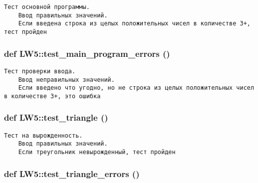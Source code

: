 \footnotesize\begin{verbatim}Тест основной программы.
    Ввод правильных значений.
    Если введена строка из целых положительных чисел в количестве 3+, тест пройден\end{verbatim}
\normalsize
 \hypertarget{namespace_l_w5_24b0846f3346125f53f802a4f6291546}{
\subsubsection[{test\_\-main\_\-program\_\-errors}]{\setlength{\rightskip}{0pt plus 5cm}def LW5::test\_\-main\_\-program\_\-errors ()}}
\label{namespace_l_w5_24b0846f3346125f53f802a4f6291546}




\footnotesize\begin{verbatim}Тест проверки ввода.
    Ввод неправильных значений.
    Если введено что угодно, но не строка из целых положительных чисел в количестве 3+, это ошибка\end{verbatim}
\normalsize
 \hypertarget{namespace_l_w5_a8dfc65142348966740631e021a65b50}{
\subsubsection[{test\_\-triangle}]{\setlength{\rightskip}{0pt plus 5cm}def LW5::test\_\-triangle ()}}
\label{namespace_l_w5_a8dfc65142348966740631e021a65b50}




\footnotesize\begin{verbatim}Тест на вырожденность.
    Ввод правильных значений.
    Если треугольник невырожденный, тест пройден\end{verbatim}
\normalsize
 \hypertarget{namespace_l_w5_f8cbf0a3bea8e2d9026208357fea8a3c}{
\subsubsection[{test\_\-triangle\_\-errors}]{\setlength{\rightskip}{0pt plus 5cm}def LW5::test\_\-triangle\_\-errors ()}}
\label{namespace_l_w5_f8cbf0a3bea8e2d9026208357fea8a3c}




